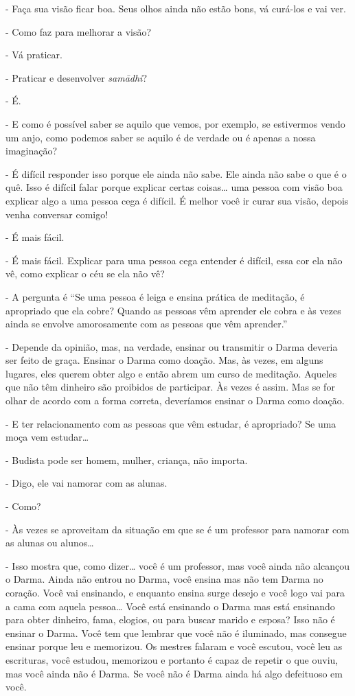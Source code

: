 - Faça sua visão ficar boa. Seus olhos ainda não estão bons, vá
curá-los e vai ver.

- Como faz para melhorar a visão?

- Vá praticar.

- Praticar e desenvolver \textit{sam\=adhi}?

- É.

- E como é possível saber se aquilo que vemos, por exemplo, se
estivermos vendo um anjo, como podemos saber se aquilo é de verdade ou
é apenas a nossa imaginação?

- É difícil responder isso porque ele ainda não sabe. Ele ainda
não sabe o que é o quê. Isso é difícil falar porque explicar certas
coisas… uma pessoa com visão boa explicar algo a uma pessoa cega é
difícil. É melhor você ir curar sua visão, depois venha conversar
comigo!

- É mais fácil.

- É mais fácil. Explicar para uma pessoa cega entender é difícil,
essa cor ela não vê, como explicar o céu se ela não vê?

- A pergunta é “Se uma pessoa é leiga e ensina prática de
meditação, é apropriado que ela cobre? Quando as pessoas vêm aprender
ele cobra e às vezes ainda se envolve amorosamente com as pessoas que
vêm aprender.”

- Depende da opinião, mas, na verdade, ensinar ou transmitir o
Darma deveria ser feito de graça. Ensinar o Darma como doação. Mas, às
vezes, em alguns lugares, eles querem obter algo e então abrem um curso
de meditação. Aqueles que não têm dinheiro são proibidos de participar.
Às vezes é assim. Mas se for olhar de acordo com a forma correta,
deveríamos ensinar o Darma como doação.

- E ter relacionamento com as pessoas que vêm estudar, é
apropriado? Se uma moça vem estudar…

- Budista pode ser homem, mulher, criança, não importa.

- Digo, ele vai namorar com as alunas.

- Como?

- Às vezes se aproveitam da situação em que se é um professor para
namorar com as alunas ou alunos…

- Isso mostra que, como dizer… você é um professor, mas você ainda
não alcançou o Darma. Ainda não entrou no Darma, você ensina mas não
tem Darma no coração. Você vai ensinando, e enquanto ensina surge
desejo e você logo vai para a cama com aquela pessoa… Você está
ensinando o Darma mas está ensinando para obter dinheiro, fama,
elogios, ou para buscar marido e esposa? Isso não é ensinar o Darma.
Você tem que lembrar que você não é iluminado, mas consegue ensinar
porque leu e memorizou. Os mestres falaram e você escutou, você leu as
escrituras, você estudou, memorizou e portanto é capaz de repetir o que
ouviu, mas você ainda não é Darma. Se você não é Darma ainda há algo
defeituoso em você.

